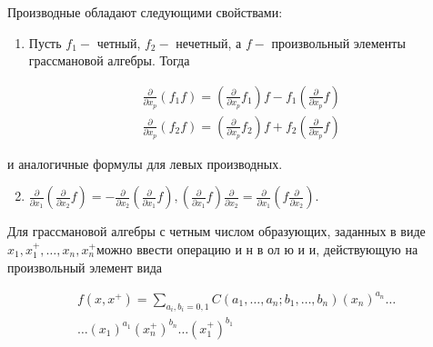 \documentclass[10pt]{article}
\begin{document}
Производные обладают следующими свойствами:



\begin{enumerate}

  \item Пусть $f_{1}-$ четный, $f_{2}-$ нечетный, а $f-$ произвольный элементы грассмановой алгебры. Тогда

\end{enumerate}



\[

\begin{aligned}

& \frac{\partial}{\partial x_{p}}\left(f_{1} f\right)=\left(\frac{\partial}{\partial x_{p}} f_{1}\right) f-f_{1}\left(\frac{\partial}{\partial x_{p}} f\right) \\

& \frac{\partial}{\partial x_{p}}\left(f_{2} f\right)=\left(\frac{\partial}{\partial x_{p}} f_{2}\right) f+f_{2}\left(\frac{\partial}{\partial x_{p}} f\right)

\end{aligned}

\]



и аналогичные формулы для левых производных.



\begin{enumerate}

  \setcounter{enumi}{1}

  \item $\frac{\partial}{\partial x_{1}}\left(\frac{\partial}{\partial x_{2}} f\right)=-\frac{\partial}{\partial x_{2}}\left(\frac{\partial}{\partial x_{1}} f\right),\left(\frac{\partial}{\partial x_{1}} f\right) \frac{\partial}{\partial x_{2}}=\frac{\partial}{\partial x_{1}}\left(f \frac{\partial}{\partial x_{2}}\right)$.

\end{enumerate}



Для грассмановой алгебры с четным числом образующих, заданных в виде $x_{1}, x_{1}^{+}, \ldots, x_{n}, x_{n}^{+}$можно ввести операцию и н в ол ю и и, действующую на произвольный элемент вида



\[

\begin{gathered}

f\left(x, x^{+}\right)=\sum_{a_{i}, b_{i}=0,1} C\left(a_{1}, \ldots, a_{n} ; b_{1}, \ldots, b_{n}\right)\left(x_{n}\right)^{a_{n}} \ldots \\

\ldots\left(x_{1}\right)^{a_{1}}\left(x_{n}^{+}\right)^{b_{n}} \ldots\left(x_{1}^{+}\right)^{b_{1}}

\end{gathered}

\]
\end{document}
